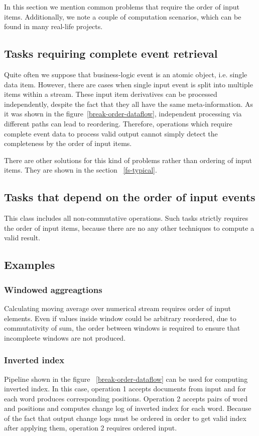 
\label {fs-tasks}

In this section we mention common problems that require the order of input items. Additionally, we note a couple of computation scenarios, which can be found in many real-life projects.

\subsection{Tasks requiring complete event retrieval}
Quite often we suppose that business-logic event is an atomic object, i.e. single data item. However, there are cases when single input event is split into multiple items within a stream. These input item derivatives can be processed independently, despite the fact that they all have the same meta-information. As it was shown in the figure~\ref{break-order-dataflow}, independent processing via different paths can lead to reordering. Therefore, operations which require complete event data to process valid output cannot simply detect the completeness by the order of input items.

There are other solutions for this kind of problems rather than ordering of input items. They are shown in the section ~\ref{fs-typical}. 

\subsection{Tasks that depend on the order of input events}
This class includes all non-commutative operations. Such tasks strictly requires the order of input items, because there are no any other techniques to compute a valid result.

\subsection{Examples}

\subsubsection{Windowed aggreagtions}
Calculating moving average over numerical stream requires order of input elements. Even if values inside window could be arbitrary reordered, due to commutativity of sum, the order between windows is required to ensure that incompleete windows are not produced.

\subsubsection{Inverted index}
Pipeline shown in the figure ~\ref{break-order-dataflow} can be used for computing inverted index. In this case, operation 1 accepts documents from input and for each word produces corresponding positions. Operation 2 accepts pairs of word and positions and computes change log of inverted index for each word. Because of the fact that output change logs must be ordered in order to get valid index after applying them, operation 2 requires ordered input. 
